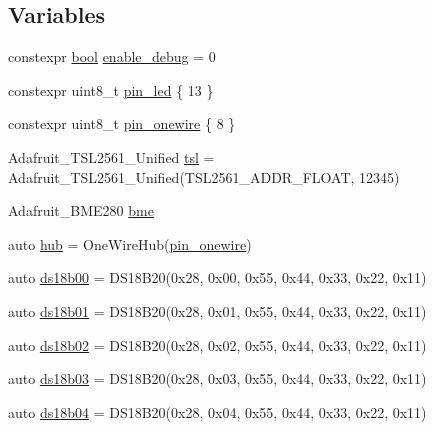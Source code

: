 \subsection*{Variables}
\begin{DoxyCompactItemize}
\item 
constexpr \hyperlink{stdbool_8h_abb452686968e48b67397da5f97445f5b}{bool} \hyperlink{OWH__DS18B20__asInterface__SensorStation_8ino_a10e1cfbd99adf655995798f1db9bfbed}{enable\-\_\-debug} = 0
\item 
constexpr uint8\-\_\-t \hyperlink{OWH__DS18B20__asInterface__SensorStation_8ino_add5a7eb759d22b21f8875663ed2c1528}{pin\-\_\-led} \{ 13 \}
\item 
constexpr uint8\-\_\-t \hyperlink{OWH__DS18B20__asInterface__SensorStation_8ino_ad4f51a015485d98cc3a8a79f41a81027}{pin\-\_\-onewire} \{ 8 \}
\item 
Adafruit\-\_\-\-T\-S\-L2561\-\_\-\-Unified \hyperlink{OWH__DS18B20__asInterface__SensorStation_8ino_a34dc1ffbb166b7afbf402f717b871f77}{tsl} = Adafruit\-\_\-\-T\-S\-L2561\-\_\-\-Unified(T\-S\-L2561\-\_\-\-A\-D\-D\-R\-\_\-\-F\-L\-O\-A\-T, 12345)
\item 
Adafruit\-\_\-\-B\-M\-E280 \hyperlink{OWH__DS18B20__asInterface__SensorStation_8ino_a2871708605796e3f6cfa9cd9328daff3}{bme}
\item 
auto \hyperlink{OWH__DS18B20__asInterface__SensorStation_8ino_a3beb275f1ae5db0a79499403dd2fbff8}{hub} = One\-Wire\-Hub(\hyperlink{OWH__DS2438__battMon__Test_8ino_ad4f51a015485d98cc3a8a79f41a81027}{pin\-\_\-onewire})
\item 
auto \hyperlink{OWH__DS18B20__asInterface__SensorStation_8ino_a32a543547840c79cf235685d5cef861b}{ds18b00} = D\-S18\-B20(0x28, 0x00, 0x55, 0x44, 0x33, 0x22, 0x11)
\item 
auto \hyperlink{OWH__DS18B20__asInterface__SensorStation_8ino_a211d281f65b23c68014c5ade33ad8046}{ds18b01} = D\-S18\-B20(0x28, 0x01, 0x55, 0x44, 0x33, 0x22, 0x11)
\item 
auto \hyperlink{OWH__DS18B20__asInterface__SensorStation_8ino_a65c9858825a2360040b6c3d8e99a6984}{ds18b02} = D\-S18\-B20(0x28, 0x02, 0x55, 0x44, 0x33, 0x22, 0x11)
\item 
auto \hyperlink{OWH__DS18B20__asInterface__SensorStation_8ino_a20efe680cbc012b4e01ddb1e350cb99b}{ds18b03} = D\-S18\-B20(0x28, 0x03, 0x55, 0x44, 0x33, 0x22, 0x11)
\item 
auto \hyperlink{OWH__DS18B20__asInterface__SensorStation_8ino_ac75e3c928eeb0a635880c9751a6b0791}{ds18b04} = D\-S18\-B20(0x28, 0x04, 0x55, 0x44, 0x33, 0x22, 0x11)

\end{DoxyCompactItemize}
